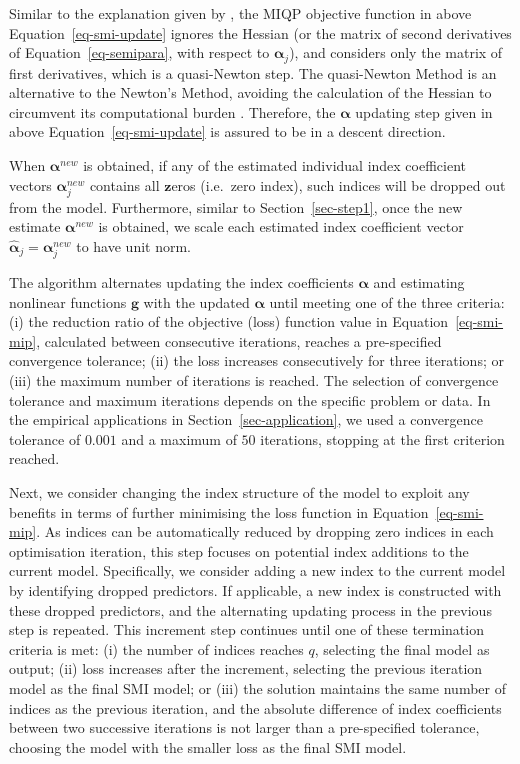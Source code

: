 \documentclass[
  11pt,
  a4paper,
]{article}
\begin{document}
Similar to the explanation given by \textcite{Masselot2022}, the MIQP
objective function in above Equation~\ref{eq-smi-update} ignores the
Hessian (or the matrix of second derivatives of
Equation~\ref{eq-semipara}, with respect to \(\bm{\alpha}_{j}\)), and
considers only the matrix of first derivatives, which is a quasi-Newton
step. The quasi-Newton Method is an alternative to the Newton's Method,
avoiding the calculation of the Hessian to circumvent its computational
burden \autocite{Peng2022}. Therefore, the \(\bm{\alpha}\) updating step
given in above Equation~\ref{eq-smi-update} is assured to be in a
descent direction.

When \(\bm{\alpha}^{new}\) is obtained, if any of the estimated
individual index coefficient vectors \(\bm{\alpha}_{j}^{new}\) contains
all \(\bm{z}\)eros (i.e.~zero index), such indices will be dropped out
from the model. Furthermore, similar to Section~\ref{sec-step1}, once
the new estimate \(\bm{\alpha}^{new}\) is obtained, we scale each
estimated index coefficient vector
\(\hat{\bm{\alpha}}_{j} = \bm{\alpha}_{j}^{new}\) to have unit norm.

The algorithm alternates updating the index coefficients \(\bm{\alpha}\)
and estimating nonlinear functions \(\bm{g}\) with the updated
\(\bm{\alpha}\) until meeting one of the three criteria: (i) the
reduction ratio of the objective (loss) function value in
Equation~\ref{eq-smi-mip}, calculated between consecutive iterations,
reaches a pre-specified convergence tolerance; (ii) the loss increases
consecutively for three iterations; or (iii) the maximum number of
iterations is reached. The selection of convergence tolerance and
maximum iterations depends on the specific problem or data. In the
empirical applications in Section~\ref{sec-application}, we used a
convergence tolerance of \(0.001\) and a maximum of \(50\) iterations,
stopping at the first criterion reached.

Next, we consider changing the index structure of the model to exploit
any benefits in terms of further minimising the loss function in
Equation~\ref{eq-smi-mip}. As indices can be automatically reduced by
dropping zero indices in each optimisation iteration, this step focuses
on potential index additions to the current model. Specifically, we
consider adding a new index to the current model by identifying dropped
predictors. If applicable, a new index is constructed with these dropped
predictors, and the alternating updating process in the previous step is
repeated. This increment step continues until one of these termination
criteria is met: (i) the number of indices reaches \(q\), selecting the
final model as output; (ii) loss increases after the increment,
selecting the previous iteration model as the final SMI model; or (iii)
the solution maintains the same number of indices as the previous
iteration, and the absolute difference of index coefficients between two
successive iterations is not larger than a pre-specified tolerance,
choosing the model with the smaller loss as the final SMI model.
\end{document}
